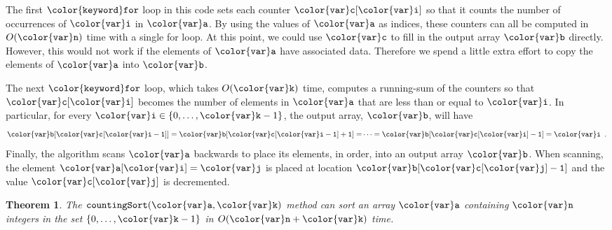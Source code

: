 \documentclass[10pt]{book}
\theoremstyle{plain}
\newtheorem{thm}{Theorem}[chapter]
\theoremstyle{definition}
\begin{document}
The first \ensuremath{\mathtt{{\color{keyword}for}}} loop in this code sets each counter \ensuremath{\mathtt{{\color{var}c}[{\color{var}i}]}} so that it
counts the number of occurrences of \ensuremath{\mathtt{{\color{var}i}}} in \ensuremath{\mathtt{{\color{var}a}}}.  By using the values
of \ensuremath{\mathtt{{\color{var}a}}} as indices, these counters can all be computed in $O(\ensuremath{\mathtt{{\color{var}n}}})$ time
with a single for loop.  At this point, we could use \ensuremath{\mathtt{{\color{var}c}}} to
fill in the output array \ensuremath{\mathtt{{\color{var}b}}} directly. However, this would not work if
the elements of \ensuremath{\mathtt{{\color{var}a}}} have associated data.  Therefore we spend a little
extra effort to copy the elements of \ensuremath{\mathtt{{\color{var}a}}} into \ensuremath{\mathtt{{\color{var}b}}}.

The next \ensuremath{\mathtt{{\color{keyword}for}}} loop, which takes $O(\ensuremath{\mathtt{{\color{var}k}}})$ time, computes a running-sum
of the counters so that \ensuremath{\mathtt{{\color{var}c}[{\color{var}i}]}} becomes the number of elements in
\ensuremath{\mathtt{{\color{var}a}}} that are less than or equal to \ensuremath{\mathtt{{\color{var}i}}}.  In particular, for every
$\ensuremath{\mathtt{{\color{var}i}}}\in\{0,\ldots,\ensuremath{\mathtt{{\color{var}k}}}-1\}$, the output array, \ensuremath{\mathtt{{\color{var}b}}}, will have
\[
   \ensuremath{\mathtt{{\color{var}b}[{\color{var}c}[{\color{var}i}-1]]}}=\ensuremath{\mathtt{{\color{var}b}[{\color{var}c}[{\color{var}i}-1]+1]=}}\cdots=\ensuremath{\mathtt{{\color{var}b}[{\color{var}c}[{\color{var}i}]-1]}}=\ensuremath{\mathtt{{\color{var}i}}} \enspace .
\]
Finally, the algorithm scans \ensuremath{\mathtt{{\color{var}a}}} backwards to place its elements, in order,
into an output array \ensuremath{\mathtt{{\color{var}b}}}.  When scanning, the element \ensuremath{\mathtt{{\color{var}a}[{\color{var}i}]={\color{var}j}}} is placed
at location \ensuremath{\mathtt{{\color{var}b}[{\color{var}c}[{\color{var}j}]-1]}} and the value \ensuremath{\mathtt{{\color{var}c}[{\color{var}j}]}} is decremented.

\begin{thm}
  The \ensuremath{\mathtt{countingSort({\color{var}a},{\color{var}k})}} method can sort an array \ensuremath{\mathtt{{\color{var}a}}} containing \ensuremath{\mathtt{{\color{var}n}}}
  integers in the set $\{0,\ldots,\ensuremath{\mathtt{{\color{var}k}}}-1\}$ in $O(\ensuremath{\mathtt{{\color{var}n}}}+\ensuremath{\mathtt{{\color{var}k}}})$ time.
\end{thm}
\end{document}
